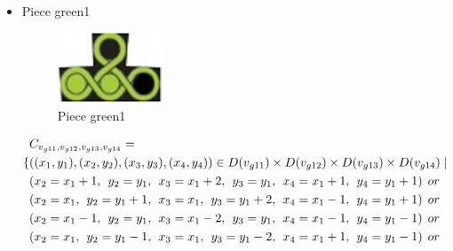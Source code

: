 \begin{appendices}
\begin{itemize}
\begin{align*}
\end{align*}
 \item Piece green1\\
\begin{figure}[H]
    \centering
    \includegraphics[width=0.3\textwidth]{figs/green1.jpg}
    \caption{Piece green1}
\end{figure}
 \begin{align*}
&\Const{g11}{g12}{g13}{g14}=
\\\{&((x_{1},y_{1}),(x_{2},y_{2}),(x_{3},y_{3}),(x_{4},y_{4}))\in \Domain{g11}\times \Domain{g12}\times\Domain{g13}\times\Domain{g14}\mid\\
&(x_{2} = x_{1} + 1,\hspace{1ex}y_{2} = y_{1},\hspace{1ex}x_{3} = x_{1} + 2, \hspace{1ex}y_{3} = y_{1},\hspace{1ex}x_{4} = x_{1}+1,\hspace{1ex}y_{4} = y_{1}+1)\hspace{1ex} or\\
&(x_{2} = x_{1},\hspace{1ex}y_{2} = y_{1}+1,\hspace{1ex}x_{3} = x_{1}, \hspace{1ex}y_{3} = y_{1}+2,\hspace{1ex}x_{4} = x_{1}-1,\hspace{1ex}y_{4} = y_{1}+1)\hspace{1ex} or\\
&(x_{2} = x_{1}-1,\hspace{1ex}y_{2} = y_{1},\hspace{1ex}x_{3} = x_{1}-2,\hspace{1ex} y_{3} = y_{1},\hspace{1ex}x_{4} = x_{1}-1,\hspace{1ex}y_{4} = y_{1}-1)\hspace{1ex} or\\
&(x_{2} = x_{1},\hspace{1ex}y_{2} = y_{1}-1,\hspace{1ex}x_{3} = x_{1}, \hspace{1ex}y_{3} = y_{1}-2,\hspace{1ex}x_{4} = x_{1}+1,\hspace{1ex}y_{4} = y_{1}-1)\hspace{1ex} or\\

\end{align*}
\end{itemize}
\end{appendices}
